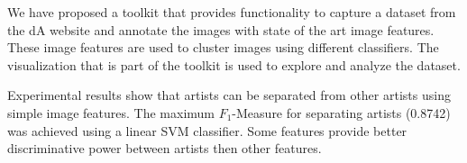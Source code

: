 We have proposed a toolkit that provides functionality to capture a dataset from the dA website and annotate the images with state of the art image features.
These image features are used to cluster images using different classifiers.
The visualization that is part of the toolkit is used to explore and analyze the dataset.

Experimental results show that artists can be separated from other artists using simple image features.
The maximum $F_1$-Measure for separating artists (0.8742) was achieved using a linear SVM classifier.
Some features provide better discriminative power between artists then other features.